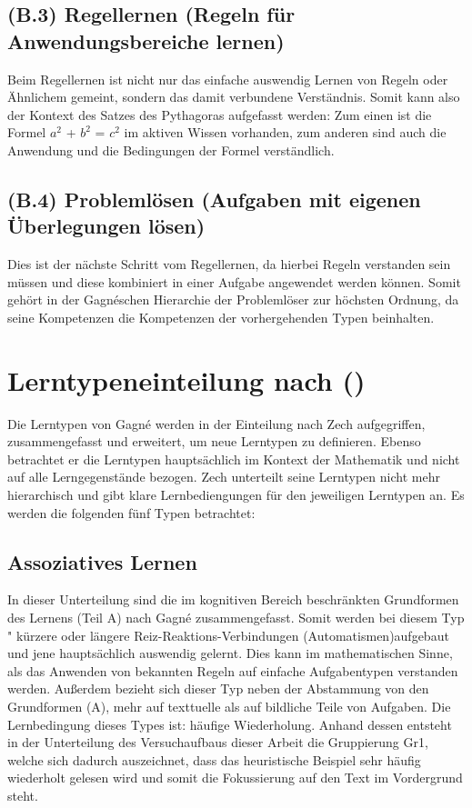 \subsection[]{(B.3) Regellernen (Regeln für Anwendungsbereiche lernen)}

Beim Regellernen ist nicht nur das einfache auswendig Lernen von Regeln oder Ähnlichem gemeint, sondern das damit verbundene Verständnis. Somit kann also der Kontext des Satzes des Pythagoras aufgefasst werden: Zum einen ist die Formel $a^2$ + $b^2$ = $c^2$ im aktiven Wissen vorhanden, zum anderen sind auch die Anwendung und die Bedingungen der Formel verständlich\cite{zech1983grundkurs}.

\subsection[]{(B.4) Problemlösen (Aufgaben mit eigenen Überlegungen lösen)}

Dies ist der nächste Schritt vom Regellernen, da hierbei Regeln verstanden sein müssen und diese kombiniert in einer Aufgabe angewendet werden können. Somit gehört in der Gagnéschen Hierarchie der Problemlöser zur höchsten Ordnung, da seine Kompetenzen die Kompetenzen der vorhergehenden Typen beinhalten\cite{zech1983grundkurs}.

\section{Lerntypeneinteilung nach \citeauthor{zech1983grundkurs} ()}

Die Lerntypen von Gagné werden in der Einteilung nach Zech aufgegriffen, zusammengefasst und erweitert, um neue Lerntypen zu definieren. Ebenso betrachtet er die Lerntypen hauptsächlich im Kontext der Mathematik und nicht auf alle Lerngegenstände bezogen. Zech unterteilt seine Lerntypen nicht mehr hierarchisch und gibt klare Lernbediengungen für den jeweiligen Lerntypen an. Es werden die folgenden fünf Typen betrachtet:

\subsection[]{Assoziatives Lernen}

In dieser Unterteilung sind die im kognitiven Bereich beschränkten Grundformen des Lernens (Teil A) nach Gagné zusammengefasst. Somit werden bei diesem Typ " kürzere oder längere Reiz-Reaktions-Verbindungen (Automatismen)\grqq  aufgebaut und jene hauptsächlich auswendig gelernt. Dies kann im mathematischen Sinne, als das Anwenden von bekannten Regeln auf einfache Aufgabentypen verstanden werden. Außerdem bezieht sich dieser Typ neben der Abstammung von den Grundformen (A), mehr auf texttuelle als auf bildliche Teile von Aufgaben.
Die Lernbedingung dieses Types ist: häufige Wiederholung. 
Anhand dessen entsteht in der Unterteilung des Versuchaufbaus dieser Arbeit die Gruppierung \gls{Gr1}, welche sich dadurch auszeichnet, dass das heuristische Beispiel sehr häufig wiederholt gelesen wird und somit die Fokussierung auf den Text im Vordergrund steht. 



